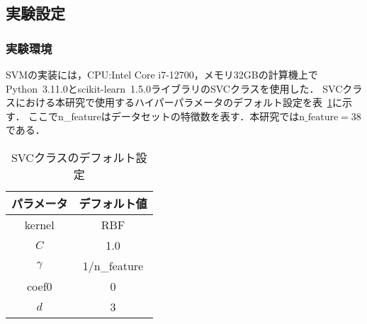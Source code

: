 \subsection{実験設定}
\subsubsection{実験環境}
SVMの実装には，CPU:Intel Core i7-12700，メモリ32GBの計算機上で
Python~3.11.0とscikit-learn~1.5.0ライブラリのSVCクラスを使用した．
SVCクラスにおける本研究で使用するハイパーパラメータのデフォルト設定を表~\ref{default}に示す．
ここでn\_featureはデータセットの特徴数を表す．本研究では$\text{n\_feature}=38$である．
\begin{table}[tb]
    \centering
    \caption{SVCクラスのデフォルト設定}
    \begin{tabular}{|c|c|}  %
      \hline  %
      パラメータ & デフォルト値 \\  %
      \hline  %
      kernel & RBF\\  %
      \hline  %
      $C$ & 1.0 \\  %
      \hline  %
      $\gamma$ & 1/n\_feature\\  %
      \hline  %
      coef0 & 0\\  %
      \hline  %
      $d$ & 3\\  %
      \hline  %
  \end{tabular}
    \label{default}  %
  \end{table}
